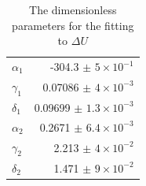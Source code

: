 \begin{table}[htb]
\begin{center}
\label{tabFit}
\begin{tabular}{| l | r | }
\hline
$\alpha_1$ & -304.3 $\pm$ $5 \times 10^{-1} $\\
$\gamma_1$ & 0.07086 $\pm$ $ 4 \times 10^{-3}$ \\ 
$\delta_1$ & 0.09699 $\pm $ $1.3 \times 10^{-3}$\\ 
$\alpha_2$ & 0.2671 $\pm $ $6.4 \times 10^{-3}$  \\
$\gamma_2$& 	2.213 $\pm $ $4 \times 10^{-2}$ \\
$\delta_2$ & 1.471 $\pm $ $9 \times 10^{-2} $\\
  \hline
\end{tabular}
\caption{The dimensionless parameters for the fitting to $\Delta U$}
\end{center}
\end{table}